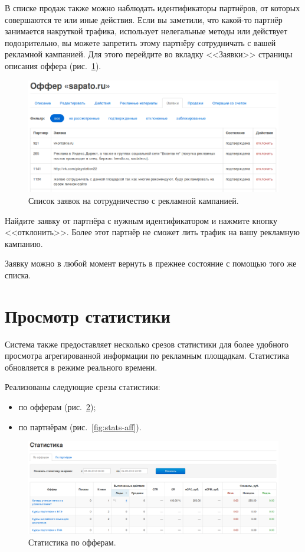 \documentclass[a4paper,12pt]{article}
\begin{document}
В списке продаж также можно наблюдать идентификаторы партнёров, от которых совершаются те или иные действия. Если вы заметили, что какой-то партнёр занимается накруткой трафика, использует нелегальные методы или действует подозрительно, вы можете запретить этому партнёру сотрудничать с вашей рекламной кампанией. Для этого перейдите во вкладку <<Заявки>> страницы описания оффера (рис.~\ref{fig:requests}).

\begin{figure}[!ht]
\centering
\includegraphics[width=\textwidth]{include/requests.png}
\caption{Список заявок на сотрудничество с рекламной кампанией.}
\label{fig:requests}
\end{figure}

Найдите заявку от партнёра с нужным идентификатором и нажмите кнопку <<отклонить>>. Более этот партнёр не сможет лить трафик на вашу рекламную кампанию.

Заявку можно в любой момент вернуть в прежнее состояние с помощью того же списка.

\section{Просмотр статистики}

Система \heymoose{} также предоставляет несколько срезов статистики для более удобного просмотра агрегированной информации по рекламным площадкам. Статистика обновляется в режиме реального времени.

Реализованы следующие срезы статистики:

\begin{itemize}
\item по офферам (рис.~\ref{fig:stats-offer});
\item по партнёрам (рис.~\ref{fig:stats-aff}).
\end{itemize}

\begin{figure}[!ht]
\centering
\includegraphics[width=\textwidth]{include/stats-offer.png}
\caption{Статистика по офферам.}
\label{fig:stats-offer}
\end{figure}
\end{document}
